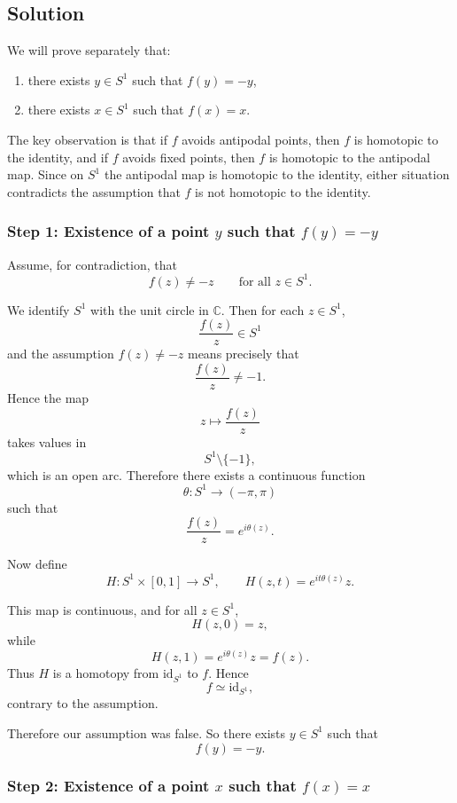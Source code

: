 \documentclass[12pt,a4paper]{article}
\theoremstyle{notespace}
\begin{document}
\subsection{Solution}

We will prove separately that:

\begin{enumerate}
	\item there exists \(y\in S^1\) such that \(f(y)=-y\),
	\item there exists \(x\in S^1\) such that \(f(x)=x\).
\end{enumerate}

The key observation is that if \(f\) avoids antipodal points, then \(f\) is homotopic to the identity, and if \(f\) avoids fixed points, then \(f\) is homotopic to the antipodal map. Since on \(S^1\) the antipodal map is homotopic to the identity, either situation contradicts the assumption that \(f\) is not homotopic to the identity.

\subsubsection{Step 1: Existence of a point \(y\) such that \(f(y)=-y\)}

Assume, for contradiction, that
\[
f(z)\neq -z
\qquad\text{for all }z\in S^1.
\]

We identify \(S^1\) with the unit circle in \(\mathbb C\). Then for each \(z\in S^1\),
\[
\frac{f(z)}{z}\in S^1
\]
and the assumption \(f(z)\neq -z\) means precisely that
\[
\frac{f(z)}{z}\neq -1.
\]
Hence the map
\[
z\longmapsto \frac{f(z)}{z}
\]
takes values in
\[
S^1\setminus\{-1\},
\]
which is an open arc. Therefore there exists a continuous function
\[
\theta:S^1\to (-\pi,\pi)
\]
such that
\[
\frac{f(z)}{z}=e^{i\theta(z)}.
\]

Now define
\[
H:S^1\times[0,1]\to S^1,
\qquad
H(z,t)=e^{it\theta(z)}z.
\]

This map is continuous, and for all \(z\in S^1\),
\[
H(z,0)=z,
\]
while
\[
H(z,1)=e^{i\theta(z)}z=f(z).
\]
Thus \(H\) is a homotopy from \(\mathrm{id}_{S^1}\) to \(f\). Hence
\[
f\simeq \mathrm{id}_{S^1},
\]
contrary to the assumption.

Therefore our assumption was false. So there exists \(y\in S^1\) such that
\[
f(y)=-y.
\]

\subsubsection{Step 2: Existence of a point \(x\) such that \(f(x)=x\)}
\end{document}

